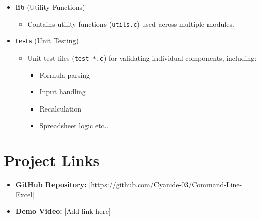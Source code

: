 \documentclass{article}
\begin{document}
\begin{itemize}
    \item \textbf{lib} (Utility Functions)
    \begin{itemize}
        \item Contains utility functions (\texttt{utils.c}) used across multiple modules.
    \end{itemize}

    \item \textbf{tests} (Unit Testing)
    \begin{itemize}
        \item Unit test files (\texttt{test\_*.c}) for validating individual components, including:
        \begin{itemize}
            \item Formula parsing
            \item Input handling
            \item Recalculation
            \item Spreadsheet logic etc..
        \end{itemize}
    \end{itemize}

\end{itemize}


\section{Project Links}
\begin{itemize}
    \item \textbf{GitHub Repository:} [https://github.com/Cyanide-03/Command-Line-Excel]
    \item \textbf{Demo Video:} [Add link here]
\end{itemize}
\end{document}
